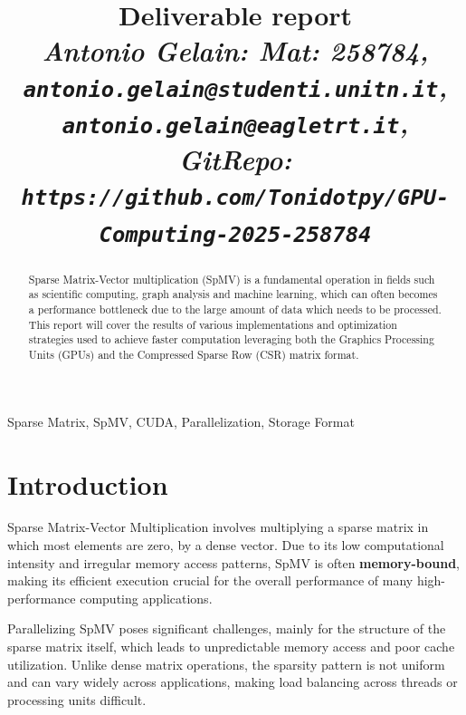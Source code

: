 \documentclass[conference]{IEEEtran}
\begin{document}
    \title{Deliverable report \\
    \footnotesize \textit{Antonio Gelain: Mat: 258784, \\
    \texttt{antonio.gelain@studenti.unitn.it}, \\
    \texttt{antonio.gelain@eagletrt.it}, \\
    GitRepo: \texttt{https://github.com/Tonidotpy/GPU-Computing-2025-258784}}}

    \maketitle

    \begin{abstract}
        Sparse Matrix-Vector multiplication (SpMV) is a fundamental operation
        in fields such as scientific computing, graph analysis and machine
        learning, which can often becomes a performance bottleneck due to the
        large amount of data which needs to be processed.
        This report will cover the results of various implementations and
        optimization strategies used to achieve faster computation leveraging
        both the Graphics Processing Units (GPUs) and the Compressed Sparse Row
        (CSR) matrix format.
    \end{abstract}

    \begin{IEEEkeywords}
        Sparse Matrix, SpMV, CUDA, Parallelization, Storage Format
    \end{IEEEkeywords}

    \section{Introduction} 
    
    Sparse Matrix-Vector Multiplication involves multiplying a sparse matrix in
    which most elements are zero, by a dense vector.
    Due to its low computational intensity and irregular memory access patterns,
    SpMV is often \textbf{memory-bound}, making its efficient execution crucial
    for the overall performance of many high-performance computing applications.

    Parallelizing SpMV poses significant challenges, mainly for the structure
    of the sparse matrix itself, which leads to unpredictable memory access
    and poor cache utilization.
    Unlike dense matrix operations, the sparsity pattern is not uniform and can
    vary widely across applications, making load balancing across threads or
    processing units difficult.
\end{document}

